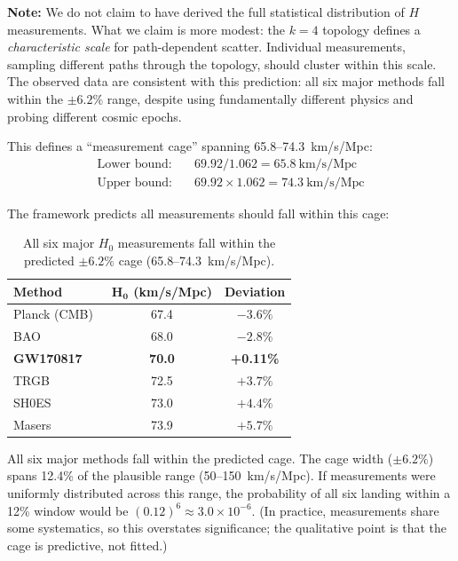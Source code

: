 \documentclass[aps,prd,preprint,superscriptaddress,showpacs,preprintnumbers,amsmath,amssymb,nofootinbib]{revtex4-2}
\begin{document}
\textbf{Note:} We do not claim to have derived the full statistical distribution of $H$ measurements. What we claim is more modest: the $k=4$ topology defines a \emph{characteristic scale} for path-dependent scatter. Individual measurements, sampling different paths through the topology, should cluster within this scale. The observed data are consistent with this prediction: all six major methods fall within the $\pm 6.2\%$ range, despite using fundamentally different physics and probing different cosmic epochs.

This defines a ``measurement cage'' spanning 65.8--74.3~km/s/Mpc:
\begin{align*}
\text{Lower bound:} &\quad 69.92 / 1.062 = 65.8~\text{km/s/Mpc} \\
\text{Upper bound:} &\quad 69.92 \times 1.062 = 74.3~\text{km/s/Mpc}
\end{align*}

The framework predicts all measurements should fall within this cage:

\begin{table}[H]
\centering
\begin{tabular*}{\textwidth}{@{\extracolsep{\fill}} lcc @{}}
\toprule
\textbf{Method} & $\mathbf{H_0}$ \textbf{(km/s/Mpc)} & \textbf{Deviation} \\
\midrule
Planck (CMB)~\cite{planck2020} & 67.4 & $-3.6\%$ \\
BAO & 68.0 & $-2.8\%$ \\
\textbf{GW170817} & \textbf{70.0} & \textbf{+0.11\%} \\
TRGB & 72.5 & $+3.7\%$ \\
SH0ES~\cite{riess2022} & 73.0 & $+4.4\%$ \\
Masers & 73.9 & $+5.7\%$ \\
\bottomrule
\end{tabular*}
\caption{All six major $H_0$ measurements fall within the predicted $\pm 6.2\%$ cage (65.8--74.3~km/s/Mpc).}
\label{tab:hubble}
\end{table}

All six major methods fall within the predicted cage. The cage width ($\pm 6.2\%$) spans 12.4\% of the plausible range (50--150~km/s/Mpc). If measurements were uniformly distributed across this range, the probability of all six landing within a 12\% window would be $(0.12)^6 \approx 3.0 \times 10^{-6}$. (In practice, measurements share some systematics, so this overstates significance; the qualitative point is that the cage is predictive, not fitted.)
\end{document}
